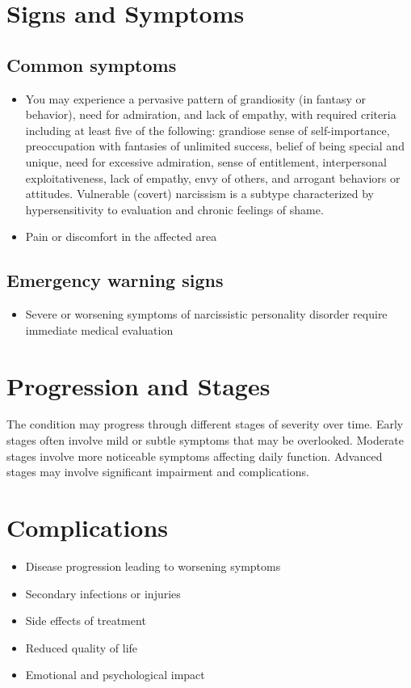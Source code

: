 \section{Signs and Symptoms}
\subsection{Common symptoms}
\begin{itemize}[noitemsep]
  \item You may experience a pervasive pattern of grandiosity (in fantasy or behavior), need for admiration, and lack of empathy, with required criteria including at least five of the following: grandiose sense of self-importance, preoccupation with fantasies of unlimited success, belief of being special and unique, need for excessive admiration, sense of entitlement, interpersonal exploitativeness, lack of empathy, envy of others, and arrogant behaviors or attitudes. Vulnerable (covert) narcissism is a subtype characterized by hypersensitivity to evaluation and chronic feelings of shame.
  \item Pain or discomfort in the affected area
  \end{itemize}
\subsection{Emergency warning signs}
\begin{itemize}[noitemsep]
  \item Severe or worsening symptoms of narcissistic personality disorder require immediate medical evaluation
\end{itemize}
\section{Progression and Stages}
The condition may progress through different stages of severity over time. Early stages often involve mild or subtle symptoms that may be overlooked. Moderate stages involve more noticeable symptoms affecting daily function. Advanced stages may involve significant impairment and complications.
\section{Complications}
\begin{itemize}[noitemsep]
  \item Disease progression leading to worsening symptoms
  \item Secondary infections or injuries
  \item Side effects of treatment
  \item Reduced quality of life
  \item Emotional and psychological impact
\end{itemize}
